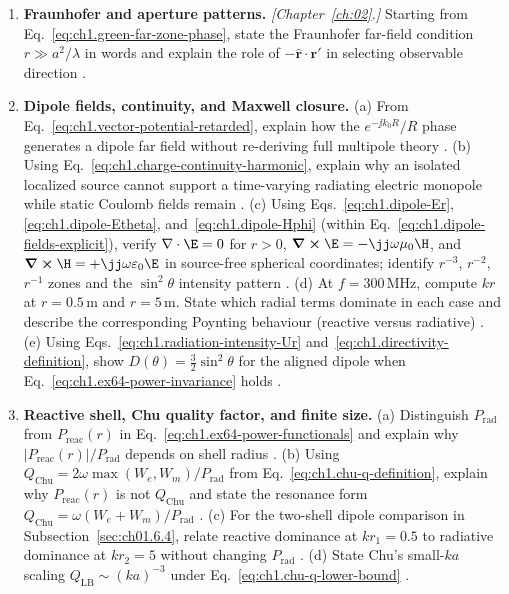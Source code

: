 \begin{enumerate}
\item \textbf{Fraunhofer and aperture patterns.}
\emph{[Chapter~\ref{ch:02}.]} Starting from Eq.~\eqref{eq:ch1.green-far-zone-phase}, state the Fraunhofer far-field condition $r\gg a^2/\lambda$ in words and explain the role of $-\hat{\mathbf{r}}\cdot\mathbf{r}'$ in selecting observable direction \cite{bornwolf1999,silver1949}.

\item \textbf{Dipole fields, continuity, and Maxwell closure.}
(a) From Eq.~\eqref{eq:ch1.vector-potential-retarded}, explain how the $e^{-\jj k_0 R}/R$ phase generates a dipole far field without re-deriving full multipole theory \cite{jackson1999,stratton1941}.
(b) Using Eq.~\eqref{eq:ch1.charge-continuity-harmonic}, explain why an isolated localized source cannot support a time-varying radiating electric monopole while static Coulomb fields remain \cite{maxwell1873,stratton1941}.
(c) Using Eqs.~\eqref{eq:ch1.dipole-Er}, \eqref{eq:ch1.dipole-Etheta}, and~\eqref{eq:ch1.dipole-Hphi} (within Eq.~\eqref{eq:ch1.dipole-fields-explicit}), verify $\nabla\cdot\E=0$ for $r>0$, $\curl\E=-\jj\omega\mu_0\H$, and $\curl\H=+\jj\omega\varepsilon_0\E$ in source-free spherical coordinates; identify $r^{-3}$, $r^{-2}$, $r^{-1}$ zones and the $\sin^2\theta$ intensity pattern \cite{stratton1941}.
(d) At $f=300\,\mathrm{MHz}$, compute $kr$ at $r=0.5\,\mathrm{m}$ and $r=5\,\mathrm{m}$. State which radial terms dominate in each case and describe the corresponding Poynting behaviour (reactive versus radiative) \cite{stratton1941,poynting1884}.
(e) Using Eqs.~\eqref{eq:ch1.radiation-intensity-Ur} and~\eqref{eq:ch1.directivity-definition}, show $D(\theta)=\tfrac32\sin^2\theta$ for the aligned dipole when Eq.~\eqref{eq:ch1.ex64-power-invariance} holds \cite{harrington2001}.

\item \textbf{Reactive shell, Chu quality factor, and finite size.}
(a) Distinguish $P_{\mathrm{rad}}$ from $P_{\mathrm{reac}}(r)$ in Eq.~\eqref{eq:ch1.ex64-power-functionals} and explain why $|P_{\mathrm{reac}}(r)|/P_{\mathrm{rad}}$ depends on shell radius \cite{poynting1884,stratton1941}.
(b) Using $Q_{\mathrm{Chu}}=2\omega\max(W_e,W_m)/P_{\mathrm{rad}}$ from Eq.~\eqref{eq:ch1.chu-q-definition}, explain why $P_{\mathrm{reac}}(r)$ is not $Q_{\mathrm{Chu}}$ and state the resonance form $Q_{\mathrm{Chu}}=\omega(W_e+W_m)/P_{\mathrm{rad}}$ \cite{chu1948}.
(c) For the two-shell dipole comparison in Subsection~\ref{sec:ch01.6.4}, relate reactive dominance at $kr_1=0.5$ to radiative dominance at $kr_2=5$ without changing $P_{\mathrm{rad}}$ \cite{stratton1941}.
(d) State Chu's small-$ka$ scaling $Q_{\mathrm{LB}}\sim(ka)^{-3}$ under Eq.~\eqref{eq:ch1.chu-q-lower-bound} \cite{chu1948,harrington2001}.
\end{enumerate}
